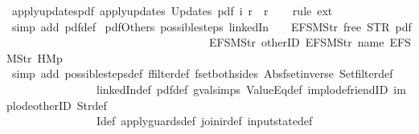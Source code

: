 \begin{isabellebody}
\endisatagproof
{\isafoldproof}%
%
\isadelimproof
\isanewline
%
\endisadelimproof
\isanewline
{}\isamarkupfalse%
\ apply{\isacharunderscore}updates{\isacharunderscore}pdf{\isacharcolon}\ {\isachardoublequoteopen}apply{\isacharunderscore}updates\ {\isacharparenleft}Updates\ pdf{\isacharparenright}\ i\ r\ {\isacharequal}\ r{\isachardoublequoteclose}\isanewline
%
\isadelimproof
\ \ %
\endisadelimproof
%
\isatagproof
{}\isamarkupfalse%
\ {\isacharparenleft}rule\ ext{\isacharparenright}\isanewline
\ \ \isamarkupfalse%
\ {\isacharparenleft}simp\ add{\isacharcolon}\ pdf{\isacharunderscore}def{\isacharparenright}%
\endisatagproof
{\isafoldproof}%
%
\isadelimproof
\isanewline
%
\endisadelimproof
\isanewline
{}\isamarkupfalse%
\ pdfOther{\isacharunderscore}s{}{\isacharcolon}\ {\isachardoublequoteopen}possible{\isacharunderscore}steps\ linkedIn\ {}\ {\isacharless}{}\ {\isacharcolon}{\isacharequal}\ EFSM{\isachardot}Str\ {\isacharprime}{\isacharprime}free{\isacharprime}{\isacharprime}{\isachargreater}\ STR\ {\isacharprime}{\isacharprime}pdf{\isacharprime}{\isacharprime}\isanewline
\ \ \ \ \ \ \ \ \ \ \ \ \ \ \ \ \ \ \ \ \ \ \ \ \ \ \ \ \ \ \ \ \ \ \ \ {\isacharbrackleft}EFSM{\isachardot}Str\ {\isacharprime}{\isacharprime}otherID{\isacharprime}{\isacharprime}{\isacharcomma}\ EFSM{\isachardot}Str\ {\isacharprime}{\isacharprime}name{\isacharprime}{\isacharprime}{\isacharcomma}\ EFSM{\isachardot}Str\ {\isacharprime}{\isacharprime}HM{}p{\isacharprime}{\isacharprime}{\isacharbrackright}\ {\isacharequal}\ {\isacharbraceleft}{\isacharbar}{\isacharbar}{\isacharbraceright}{\isachardoublequoteclose}\isanewline
%
\isadelimproof
\ \ %
\endisadelimproof
%
\isatagproof
{}\isamarkupfalse%
\ {\isacharparenleft}simp\ add{\isacharcolon}\ possible{\isacharunderscore}steps{\isacharunderscore}def\ ffilter{\isacharunderscore}def\ fset{\isacharunderscore}both{\isacharunderscore}sides\ Abs{\isacharunderscore}fset{\isacharunderscore}inverse\ Set{\isachardot}filter{\isacharunderscore}def\isanewline
\ \ \ \ \ \ \ \ \ \ \ \ \ \ \ \ linkedIn{\isacharunderscore}def\ pdf{\isacharunderscore}def\ gval{\isachardot}simps\ ValueEq{\isacharunderscore}def\ implode{\isacharunderscore}friendID\ implode{\isacharunderscore}otherID\ Str{\isacharunderscore}def\isanewline
\ \ \ \ \ \ \ \ \ \ \ \ \ \ \ \ I{\isacharunderscore}def\ apply{\isacharunderscore}guards{\isacharunderscore}def\ join{\isacharunderscore}ir{\isacharunderscore}def\ input{}state{\isacharunderscore}def{\isacharparenright}%

\end{isabellebody}

